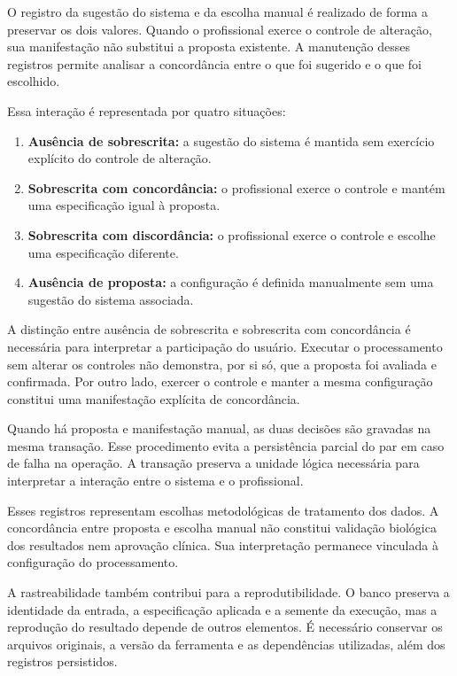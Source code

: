 O registro da sugestão do sistema e da escolha manual é realizado de forma a preservar os dois valores. Quando o profissional exerce o controle de alteração, sua manifestação não substitui a proposta existente. A manutenção desses registros permite analisar a concordância entre o que foi sugerido e o que foi escolhido.

Essa interação é representada por quatro situações:

\begin{enumerate}
    \item \textbf{Ausência de sobrescrita:} a sugestão do sistema é mantida sem exercício explícito do controle de alteração.
    \item \textbf{Sobrescrita com concordância:} o profissional exerce o controle e mantém uma especificação igual à proposta.
    \item \textbf{Sobrescrita com discordância:} o profissional exerce o controle e escolhe uma especificação diferente.
    \item \textbf{Ausência de proposta:} a configuração é definida manualmente sem uma sugestão do sistema associada.
\end{enumerate}

A distinção entre ausência de sobrescrita e sobrescrita com concordância é necessária para interpretar a participação do usuário. Executar o processamento sem alterar os controles não demonstra, por si só, que a proposta foi avaliada e confirmada. Por outro lado, exercer o controle e manter a mesma configuração constitui uma manifestação explícita de concordância.

Quando há proposta e manifestação manual, as duas decisões são gravadas na mesma transação. Esse procedimento evita a persistência parcial do par em caso de falha na operação. A transação preserva a unidade lógica necessária para interpretar a interação entre o sistema e o profissional.

Esses registros representam escolhas metodológicas de tratamento dos dados. A concordância entre proposta e escolha manual não constitui validação biológica dos resultados nem aprovação clínica. Sua interpretação permanece vinculada à configuração do processamento.

A rastreabilidade também contribui para a reprodutibilidade. O banco preserva a identidade da entrada, a especificação aplicada e a semente da execução, mas a reprodução do resultado depende de outros elementos. É necessário conservar os arquivos originais, a versão da ferramenta e as dependências utilizadas, além dos registros persistidos.

